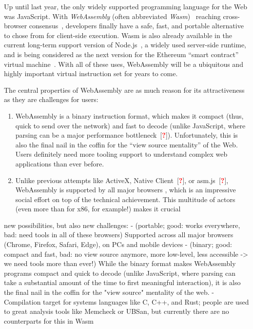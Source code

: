 \documentclass[sigplan,review,anonymous]{acmart}\settopmatter{printfolios=true,printccs=false,printacmref=false}
\newcommand{\citeTodo}{[\textcolor{red}{\bfseries?}]}
\begin{document}
Up until last year, the only widely supported programming language for the Web was JavaScript. With \emph{WebAssembly} (often abbreviated \emph{Wasm})~\cite{Haas:2017:BWU:3062341.3062363, WasmWebsite} reaching cross-browser consensus~\cite{WasmConsensus}, developers finally have a safe, fast, and portable alternative to chose from for client-side execution. Wasm is also already available in the current long-term support version of Node.js~\cite{NodejsWebsite}, a widely used server-side runtime, and is being considered as the next version for the Ethereum \enquote{smart contract} virtual machine~\cite{EthereumWasm}. With all of these uses, WebAssembly will be a ubiquitous and highly important virtual instruction set for years to come.

The central properties of WebAssembly are as much reason for its attractiveness as they are challenges for users: 

\begin{enumerate}
	\item WebAssembly is a binary instruction format, which makes it compact (thus, quick to send over the network) and fast to decode (unlike JavaScript, where parsing can be a major performance bottleneck~\citeTodo). Unfortunately, this is also the final nail in the coffin for the \enquote{view source mentality} of the Web. Users definitely need more tooling support to understand complex web applications than ever before.
	
	\item Unlike previous attempts like ActiveX, Native Client~\citeTodo, or asm.js~\citeTodo, WebAssembly is supported by all major browsers%
	 , which is an impressive social effort on top of the technical achievement. This multitude of actors (even more than for x86, for example!) makes it crucial 
	
\end{enumerate}




new possibilities, but also new challenges:
- (portable; good: works everywhere, bad: need tools in all of these browsers) Supported across all major browsers (Chrome, Firefox, Safari, Edge), on PCs and mobile devices
- (binary; good: compact and fast, bad: no view source anymore, more low-level, less accessible -> we need tools more than ever!) While the binary format makes WebAssembly programs compact and quick to decode (unlike JavaScript, where parsing can take a substantial amount of the time to first meaningful interaction), it is also the final nail in the coffin for the "view source" mentality of the web.
- Compilation target for systems languages like C, C++, and Rust; people are used to great analysis tools like Memcheck or UBSan, but currently there are no counterparts for this in Wasm
\end{document}
